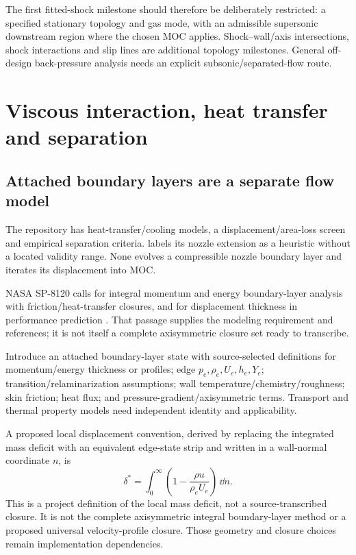 The first fitted-shock milestone should therefore be deliberately
restricted: a specified stationary topology and gas mode, with an
admissible supersonic downstream region where the chosen MOC applies.
Shock--wall/axis intersections, shock interactions and slip lines are
additional topology milestones. General off-design back-pressure
analysis needs an explicit subsonic/separated-flow route.

\section{Viscous interaction, heat transfer and separation}
\label{sec:viscous}
\subsection{Attached boundary layers are a separate flow model}
\current The repository has heat-transfer/cooling models, a
displacement/area-loss screen and empirical separation criteria.
 labels its nozzle extension
as a heuristic without a located validity range. None evolves a
compressible nozzle boundary layer and iterates its displacement into MOC.

NASA SP-8120 calls for integral momentum and energy boundary-layer
analysis with friction/heat-transfer closures, and for displacement
thickness in performance prediction \cite[PDF p.~27, printed p.~13]{sp8120}.
That passage supplies the modeling requirement and references; it is not
itself a complete axisymmetric closure set ready to transcribe.

\proposal Introduce an attached boundary-layer state with source-selected
definitions for momentum/energy thickness or profiles; edge
\(p_e,\rho_e,U_e,h_e,Y_e\); transition/relaminarization assumptions;
wall temperature/chemistry/roughness; skin friction; heat flux; and
pressure-gradient/axisymmetric terms. Transport and thermal property
models need independent identity and applicability.

A proposed local displacement convention, derived by replacing the
integrated mass deficit with an equivalent edge-state strip and written
in a wall-normal coordinate \(n\), is
\begin{equation}
\delta^*=\int_0^\infty
\left(1-\frac{\rho u}{\rho_eU_e}\right)\,\dd n .
\end{equation}
This is a project definition of the local mass deficit, not a
source-transcribed closure. It is not the complete
axisymmetric integral boundary-layer method or a proposed universal
velocity-profile closure. Those geometry and closure choices remain
implementation dependencies.

